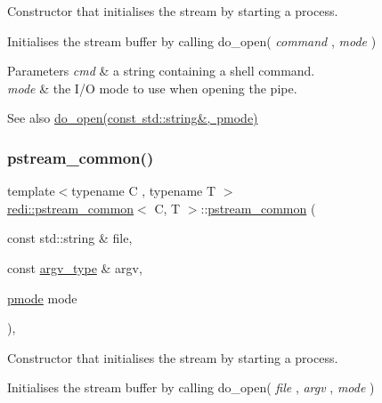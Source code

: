 Constructor that initialises the stream by starting a process. 

Initialises the stream buffer by calling do\+\_\+open( {\itshape command} , {\itshape mode} )


\begin{DoxyParams}{Parameters}
{\em cmd} & a string containing a shell command. \\
\hline
{\em mode} & the I/O mode to use when opening the pipe. \\
\hline
\end{DoxyParams}
\begin{DoxySeeAlso}{See also}
\mbox{\hyperlink{classredi_1_1pstream__common_a2505ab3e3a834b92d98b5bcb97734dfe}{do\+\_\+open(const std\+::string\&, pmode)}} 
\end{DoxySeeAlso}
\mbox{\label{classredi_1_1pstream__common_a3dc6e49c84bf1b2b3ebbea92a9ee3f6b}} 
\subsubsection{\texorpdfstring{pstream\+\_\+common()}{pstream\_common()}\hspace{0.1cm}{\footnotesize\ttfamily [3/3]}}
{\footnotesize\ttfamily template$<$typename C , typename T $>$ \\
\mbox{\hyperlink{classredi_1_1pstream__common}{redi\+::pstream\+\_\+common}}$<$ C, T $>$\+::\mbox{\hyperlink{classredi_1_1pstream__common}{pstream\+\_\+common}} (\begin{DoxyParamCaption}\item[{const std\+::string \&}]{file,  }\item[{const \mbox{\hyperlink{structredi_1_1pstreams_af902b894b095c1875e96c10129489467}{argv\+\_\+type}} \&}]{argv,  }\item[{\mbox{\hyperlink{structredi_1_1pstreams_a1eae4aad88812af03a0fbb3ec13c50b7}{pmode}}}]{mode }\end{DoxyParamCaption})\hspace{0.3cm}{\ttfamily [inline]}, {\ttfamily [protected]}}



Constructor that initialises the stream by starting a process. 

Initialises the stream buffer by calling do\+\_\+open( {\itshape file} , {\itshape argv} , {\itshape mode} )


